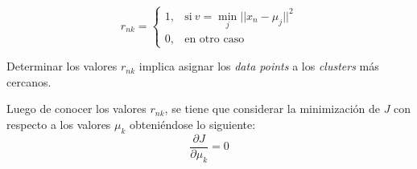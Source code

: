 \begin{equation}
  r_{nk} = \left \{
    \begin{array}{rcl}
      1, & \text{si}~ v = \min_j ||x_n - \mu_j||^2 \\
      0, & \text{en otro caso}
    \end{array}
    \right .
  \label{Equ:KMeans:rnk}
\end{equation}

Determinar los valores $r_{nk}$ implica asignar los \textit{data points} a los
\textit{clusters} más cercanos.

Luego de conocer los valores $r_{nk}$, se tiene que considerar la minimización
de $J$ con respecto a los valores $\mu_k$ obteniéndose lo siguiente:
\begin{equation}  
  \frac{\partial J}{\partial \mu_k} = 0
  \label{Equ:J-minimization}
\end{equation}

